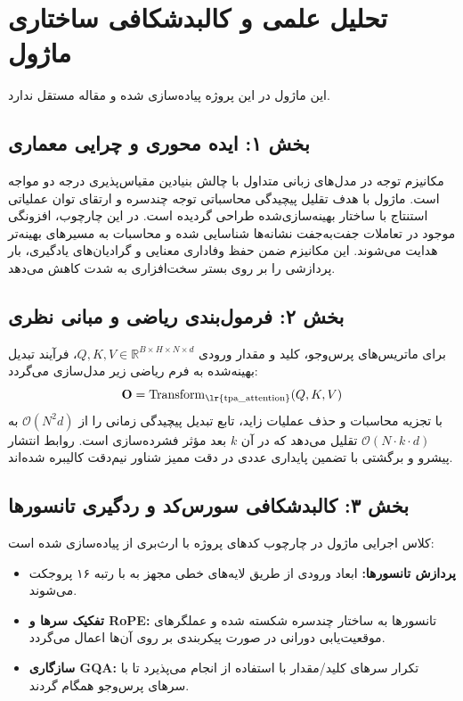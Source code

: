 \section{تحلیل علمی و کالبدشکافی ساختاری ماژول }

این ماژول در این پروژه پیاده‌سازی شده و مقاله مستقل ندارد.
\label{sec:tpa_attention}

\subsection*{بخش ۱: ایده محوری و چرایی معماری }
مکانیزم توجه در مدل‌های زبانی متداول با چالش بنیادین مقیاس‌پذیری درجه دو مواجه است. ماژول  با هدف تقلیل پیچیدگی محاسباتی توجه چندسره و ارتقای توان عملیاتی استنتاج با ساختار بهینه‌سازی‌شده طراحی گردیده است. در این چارچوب، افزونگی موجود در تعاملات جفت‌به‌جفت نشانه‌ها شناسایی شده و محاسبات به مسیرهای بهینه‌تر هدایت می‌شوند. این مکانیزم ضمن حفظ وفاداری معنایی و گرادیان‌های یادگیری، بار پردازشی را بر روی بستر سخت‌افزاری به شدت کاهش می‌دهد.

\subsection*{بخش ۲: فرمول‌بندی ریاضی و مبانی نظری }
برای ماتریس‌های پرس‌وجو، کلید و مقدار ورودی $Q, K, V \in \mathbb{R}^{B \times H \times N \times d}$، فرآیند تبدیل بهینه‌شده به فرم ریاضی زیر مدل‌سازی می‌گردد:
\begin{equation}
\mathbf{O} = \operatorname{Transform}_{\text{\lr{tpa\_attention}}}(Q, K, V)
\end{equation}
با تجزیه محاسبات و حذف عملیات زاید، تابع تبدیل پیچیدگی زمانی را از $\mathcal{O}(N^2 d)$ به $\mathcal{O}(N \cdot k \cdot d)$ تقلیل می‌دهد که در آن $k$ بعد مؤثر فشرده‌سازی است. روابط انتشار پیشرو و برگشتی با تضمین پایداری عددی در دقت ممیز شناور نیم‌دقت  کالیبره شده‌اند.

\subsection*{بخش ۳: کالبدشکافی سورس‌کد و ردگیری تانسورها }
کلاس اجرایی ماژول در چارچوب کدهای پروژه با ارث‌بری از  پیاده‌سازی شده است:
\begin{itemize}
    \item \textbf{پردازش تانسورها:} ابعاد ورودی \lr{$[B, N, D]$} از طریق لایه‌های خطی مجهز به  با رتبه ۱۶ پروجکت می‌شوند.
    \item \textbf{تفکیک سرها و RoPE:} تانسورها به ساختار چندسره \lr{$[B, H, N, d]$} شکسته شده و عملگرهای موقعیت‌یابی دورانی در صورت پیکربندی بر روی آن‌ها اعمال می‌گردد.
    \item \textbf{سازگاری GQA:} تکرار سرهای کلید/مقدار با استفاده از  انجام می‌پذیرد تا با سرهای پرس‌وجو همگام گردند.
\end{itemize}

